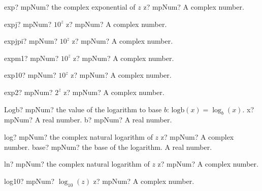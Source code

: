 \documentclass[12pt,a4paper,openany]{book}
\begin{document}
\begin{mpFunctionsExtract}
\mpFunctionOne
{exp? mpNum? the complex exponential of $z$}
{z? mpNum? A complex number.}
\end{mpFunctionsExtract}

\begin{mpFunctionsExtract}
\mpFunctionOne
{expj? mpNum?  $10^z$}
{z? mpNum? A complex number.}
\end{mpFunctionsExtract}

\begin{mpFunctionsExtract}
\mpFunctionOne
{expjpi? mpNum?  $10^z$}
{z? mpNum? A complex number.}
\end{mpFunctionsExtract}

\begin{mpFunctionsExtract}
\mpFunctionOne
{expm1? mpNum?  $10^z$}
{z? mpNum? A complex number.}
\end{mpFunctionsExtract}

\begin{mpFunctionsExtract}
\mpFunctionOne
{exp10? mpNum?  $10^z$}
{z? mpNum? A complex number.}
\end{mpFunctionsExtract}

\begin{mpFunctionsExtract}
\mpFunctionOne
{exp2? mpNum?  $2^z$}
{z? mpNum? A complex number.}
\end{mpFunctionsExtract}

\begin{mpFunctionsExtract}
\mpFunctionTwo
{Logb? mpNum? the value of the logarithm  to base $b$: $\text{logb}(x) = \log_{b}(x)$.}
{x? mpNum? A real number.}
{b? mpNum? A real number.}
\end{mpFunctionsExtract}

\begin{mpFunctionsExtract}
\mpFunctionTwo
{log? mpNum? the complex natural logarithm of $z$}
{z? mpNum? A complex number.}
{base? mpNum? the base of the logarithm. A real number.}
\end{mpFunctionsExtract}

\begin{mpFunctionsExtract}
\mpFunctionOne
{ln? mpNum? the complex natural logarithm of $z$}
{z? mpNum? A complex number.}
\end{mpFunctionsExtract}

\begin{mpFunctionsExtract}
\mpFunctionOne
{log10? mpNum? $\log_{10}(z)$}
{z? mpNum? A complex number.}
\end{mpFunctionsExtract}
\end{document}
